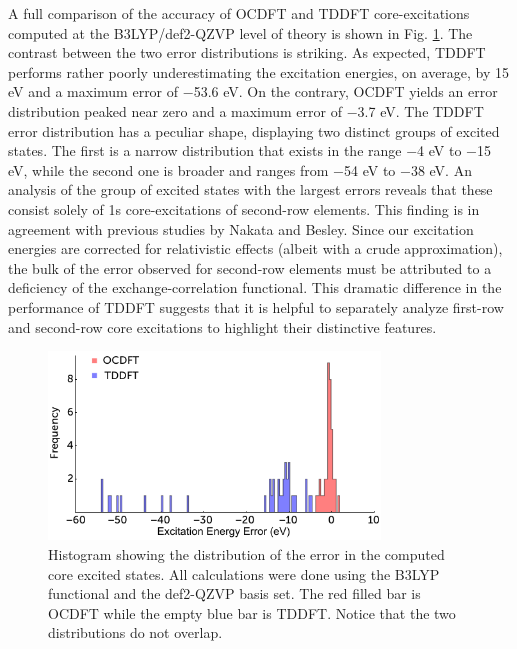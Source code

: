 \documentclass[12pt]{article}
\begin{document}
A full comparison of the accuracy of OCDFT and TDDFT core-excitations computed at the B3LYP/def2-QZVP level of theory is shown in Fig. \ref{figure:Hist}.
The contrast between the two error distributions is striking.  As expected, TDDFT performs rather poorly underestimating the excitation energies, on average, by 15 eV and a maximum error of $-$53.6 eV. 
On the contrary, OCDFT yields an error distribution peaked near zero and a maximum error of $-$3.7 eV.
The TDDFT error distribution has a peculiar shape, displaying two distinct groups of excited states. The first is a narrow distribution that exists in the range $-$4 eV to $-$15 eV, while the second one is broader and ranges from $-$54 eV to $-$38 eV. An analysis of the group of excited states with the largest errors reveals that these consist solely of 1s core-excitations of second-row elements. This finding is in agreement with previous studies by Nakata \cite{nakata_extension_2007} and Besley. \cite{besley_time-dependent_2009} Since our excitation energies are corrected for relativistic effects (albeit with a crude approximation), the bulk of the error observed for second-row elements must be attributed to a deficiency of the exchange-correlation functional.\cite{saue_relativistic_2011} This dramatic difference in the performance of TDDFT suggests that it is helpful to separately analyze first-row and second-row core excitations to highlight their distinctive features.

\begin{figure}[b]
\centering
\includegraphics[width=8.8cm]{NEW_histogram2.pdf}
\caption{Histogram showing the distribution of the error in the computed core excited states. All calculations were done using the B3LYP functional and the def2-QZVP basis set. The red filled bar is OCDFT while the empty blue bar is TDDFT. Notice that the two distributions do not overlap.}
\label{figure:Hist}
\end{figure}
\end{document}

